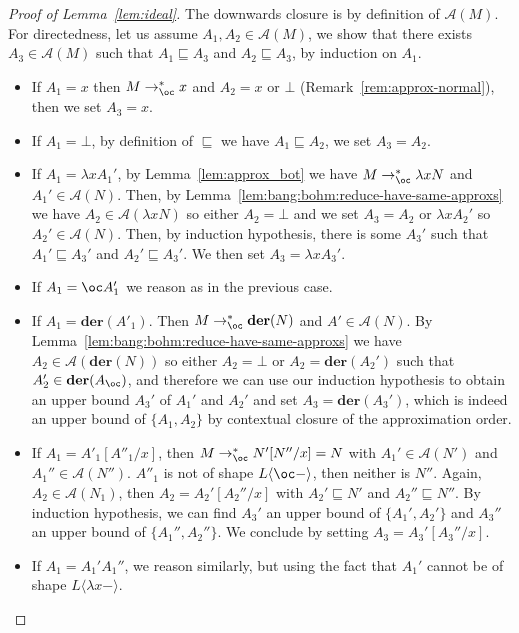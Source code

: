 \documentclass[10pt,a4paper]{article}
\newcommand{\<}{\langle}
\renewcommand{\>}{\rangle}
\newcommand{\der}[1]{\ensuremath{\mathbf{der}(#1)}}
\newcommand{\todbf}{\to_{\oc}} %
\newcommand{\es}[2]{[#1/#2]}
\newcommand{\mcal}[1]{\ensuremath{\mathcal{#1}}}
\newcommand{\setApprox}{\mcal{A}}
\newcommand{\smaller}{\ensuremath{\sqsubseteq}}
\begin{document}
\begin{proof}[Proof of Lemma~\ref{lem:ideal}]
	The downwards closure is by definition of $\setApprox(M)$. For
	directedness, let us assume $A_1, A_2 \in
			\setApprox(M)$, we show that there exists $A_3 \in \setApprox(M)$ such
			that $A_1 \smaller A_3$ and $A_2 \smaller A_3$, by
			induction on $A_1$.

	\begin{itemize}
		\item If $A_1 = x$ then $M\todbf^*x$ and
			$A_2 = x$ or $\bot$ (Remark~\ref{rem:approx-normal}), then we set $A_3=x$.
		\item If $A_1 = \bot$, by definition of $\smaller$ we
			have $A_1 \smaller A_2$, we set $A_3=A_2$.
		\item If $A_1 = \lambda x A_1'$, by
			Lemma~\ref{lem:approx_bot} we have
			$M \todbf^* \lambda x N$ and $A_1' \in
			\setApprox(N)$.
			Then, by
			Lemma~\ref{lem:bang:bohm:reduce-have-same-approxs}
			we have $A_2 \in \setApprox(\lambda x N)$ so
			either $A_2 = \bot$ 
			and we set $A_3=A_2$ or $\lambda x A_2'$ so
			$A_2' \in \setApprox(N)$.
			Then, by induction hypothesis, there
			is some $A_3'$ such that $A_1'\smaller A_3'$
			and $A_2'\smaller A_3'$. We then set
			$A_3=\lambda xA_3'$.
		\item If $A_1 = \oc A_1'$ we reason as in the previous case.
		\item If $A_1 = \der{A'_1}$.
			Then $M \todbf^* \der{N}$ and $A' \in \setApprox(N)$.
			By Lemma~\ref{lem:bang:bohm:reduce-have-same-approxs} we
			have $A_2 \in \setApprox(\der{N})$ so either
			$A_2 = \bot$ or $A_2 = \der{A_2'}$ such that
			$A_2' \in \der{A_\oc}$, and therefore we can use
			our induction hypothesis to obtain an
			upper bound $A_3'$ of $A_1'$ and $A_2'$ and set
			$A_3=\der{A_3'}$, which is indeed an upper bound
			of $\{A_1,A_2\}$ by contextual closure of the
			approximation order.
		\item If $A_1 = A'_1\es{A''_1}{x}$,
			then $M\todbf^* N'\es{N''}{x}= N$
			with $A_1' \in \setApprox(N')$ and $A_1'' \in
			\setApprox(N'')$.
			$A''_1$ is not of shape $L\<\oc-\>$, then
			neither is $N''$. Again,
			$A_2\in\setApprox(N_1)$, then
			$A_2=A_2'[A_2''/x]$ with $A_2'\smaller N'$
			and $A_2''\smaller N''$. By induction
			hypothesis, we can find $A_3'$ an upper bound of
			$\{A_1',A_2'\}$ and $A_3''$ an upper bound of
			$\{A_1'',A_2''\}$. We conclude by setting
			$A_3=A_3'[A_3''/x]$.
		\item If $A_1=A_1'A_1''$, we reason similarly, but using the
			fact that $A_1'$ cannot be of shape $L\<\lambda x -\>$. \qedhere
	\end{itemize}
\end{proof}
\end{document}

